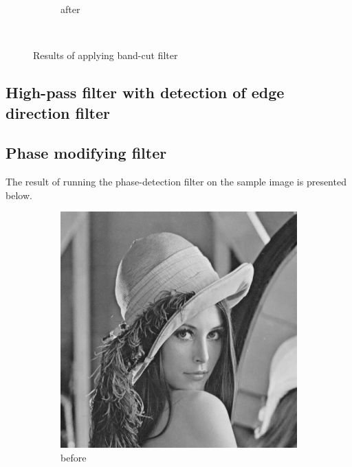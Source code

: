 \documentclass[12pt]{article}
\begin{document}
\begin{figure}[H]
\begin{subfigure}[t]{\subfiguresize}
        \caption{after}
    \end{subfigure}\\[1em]
    \caption{Results of applying band-cut filter}
\end{figure}  
\subsection{High-pass filter with detection of edge direction filter}
\subsection{Phase modifying filter}
 The result of running the phase-detection filter on the sample image is presented below.
\begin{figure}[H]\centering
    \begin{subfigure}[t]{\subfiguresize}\centering
        \includegraphics[width=\textwidth]{img/lena.png}
        \caption{before}
    \end{subfigure}
    \hspace{2em}
    \begin{subfigure}[t]{\subfiguresize}\centering

\end{subfigure}
\end{figure}
\end{document}

